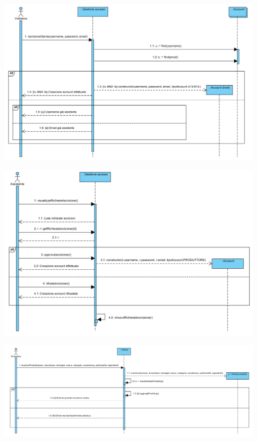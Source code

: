 \begin{center}
			\includegraphics[width=\textwidth]{assets/visualParadigm/sequenza/iscrizioneUtente}
\end{center}

\begin{center}
			\includegraphics[width=\textwidth]{assets/visualParadigm/sequenza/approvazioneIscrizione}
\end{center}

\begin{center}
			\includegraphics[width=\textwidth]{assets/visualParadigm/sequenza/inserimentoSchedaProdotto}
\end{center}

